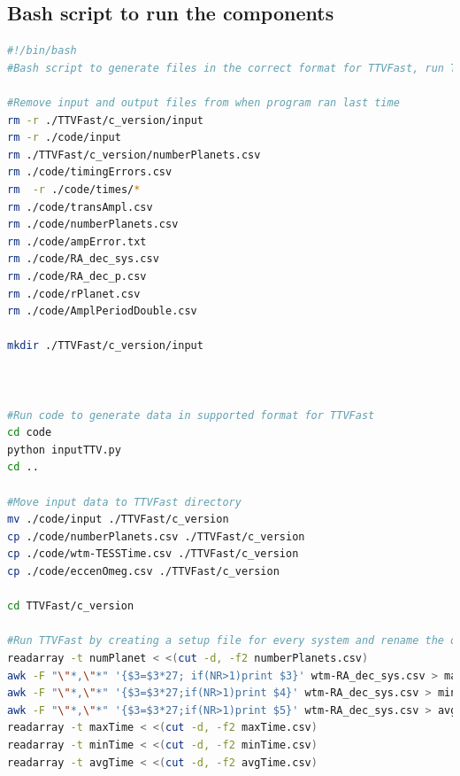 \documentclass[12pt]{report}
\newcommand{\mnras}{MNRAS}
\newcommand{\aap}{A\&A}
\begin{document}
%



\iffalse
\begin{appendix}

\chapter{Bash script to run the components}
\begin{lstlisting}[language=Bash]
#!/bin/bash
#Bash script to generate files in the correct format for TTVFast, run TTVFast and plot the results

#Remove input and output files from when program ran last time
rm -r ./TTVFast/c_version/input
rm -r ./code/input
rm ./TTVFast/c_version/numberPlanets.csv
rm ./code/timingErrors.csv
rm  -r ./code/times/*
rm ./code/transAmpl.csv
rm ./code/numberPlanets.csv
rm ./code/ampError.txt
rm ./code/RA_dec_sys.csv
rm ./code/RA_dec_p.csv
rm ./code/rPlanet.csv
rm ./code/AmplPeriodDouble.csv

mkdir ./TTVFast/c_version/input



#Run code to generate data in supported format for TTVFast
cd code
python inputTTV.py
cd ..

#Move input data to TTVFast directory
mv ./code/input ./TTVFast/c_version
cp ./code/numberPlanets.csv ./TTVFast/c_version
cp ./code/wtm-TESSTime.csv ./TTVFast/c_version
cp ./code/eccenOmeg.csv ./TTVFast/c_version

cd TTVFast/c_version

#Run TTVFast by creating a setup file for every system and rename the output file to the number of the system
readarray -t numPlanet < <(cut -d, -f2 numberPlanets.csv)
awk -F "\"*,\"*" '{$3=$3*27; if(NR>1)print $3}' wtm-RA_dec_sys.csv > maxTime.csv
awk -F "\"*,\"*" '{$3=$3*27;if(NR>1)print $4}' wtm-RA_dec_sys.csv > minTime.csv
awk -F "\"*,\"*" '{$3=$3*27;if(NR>1)print $5}' wtm-RA_dec_sys.csv > avgTime.csv
readarray -t maxTime < <(cut -d, -f2 maxTime.csv)
readarray -t minTime < <(cut -d, -f2 minTime.csv)
readarray -t avgTime < <(cut -d, -f2 avgTime.csv)




\end{lstlisting}
\end{appendix}
\end{document}
